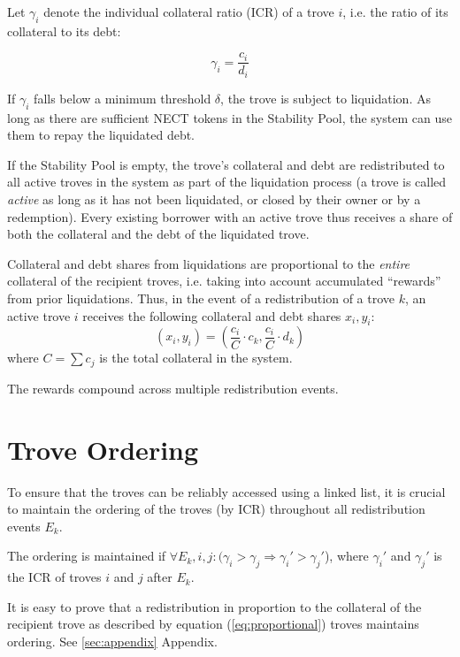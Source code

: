 \documentclass[reqno]{article}
\begin{document}
Let $\gamma_i$ denote the individual collateral ratio (ICR) of a trove $i$, i.e. the ratio of its collateral to its debt:

\begin{equation}
    \gamma_i = \frac{c_i} {d_i}
\end{equation}

If $\gamma_i$ falls below a minimum threshold $\delta$, the trove is subject to liquidation. As long as there are sufficient NECT tokens in the Stability Pool, the system can use them to repay the liquidated debt. 

If the Stability Pool is empty, the trove's collateral and debt are redistributed to all active troves in the system as part of the liquidation process (a trove is called \textit{active} as long as it has not been liquidated, or closed by their owner or by a redemption). Every existing borrower with an active trove thus receives a share of both the collateral and the debt of the liquidated trove.

Collateral and debt shares from liquidations are proportional to the \textit{entire} collateral of the recipient troves, i.e. taking into account accumulated “rewards” from prior liquidations. Thus, in the event of a redistribution of a trove $k$, an active trove $i$ receives the following collateral and debt shares $x_i,y_i$:  
\begin{equation} \label{eq:proportional}
  (x_i, y_i) = \left(\frac{c_i}{C} \cdot c_k, \frac{c_i}{C} \cdot d_k\right)
\end{equation}
where $C=\sum c_j$ is the total collateral in the system.

The rewards compound across multiple redistribution events.

\section{Trove Ordering}
To ensure that the troves can be reliably accessed using a linked list, it is crucial to maintain the ordering of the troves (by ICR) throughout all redistribution events $E_k$.

The ordering is maintained if $\forall{E_k,i,j}: (\gamma_i > \gamma_j	\Longrightarrow \gamma_i' > \gamma_j'$), where $\gamma_i'$ and $\gamma_j'$ is the ICR of troves $i$ and $j$ after $E_k$.

It is easy to prove that a redistribution in proportion to the collateral of the recipient trove as described by equation (\ref{eq:proportional}) troves maintains ordering. See \ref{sec:appendix} Appendix.
\end{document}
